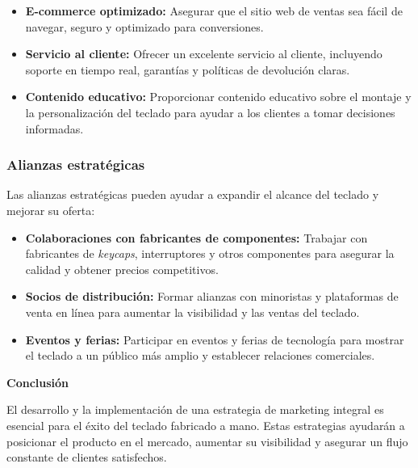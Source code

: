 \begin{itemize}
    \item \textbf{E-commerce optimizado:} Asegurar que el sitio web de ventas sea fácil de navegar, seguro y optimizado para conversiones.
    \item \textbf{Servicio al cliente:} Ofrecer un excelente servicio al cliente, incluyendo soporte en tiempo real, garantías y políticas de devolución claras.
    \item \textbf{Contenido educativo:} Proporcionar contenido educativo sobre el montaje y la personalización del teclado para ayudar a los clientes a tomar decisiones informadas.
\end{itemize}

\subsubsection{Alianzas estratégicas}

Las alianzas estratégicas pueden ayudar a expandir el alcance del teclado y mejorar su oferta:

\begin{itemize}
    \item \textbf{Colaboraciones con fabricantes de componentes:} Trabajar con fabricantes de \textit{keycaps}, interruptores y otros componentes para asegurar la calidad y obtener precios competitivos.
    \item \textbf{Socios de distribución:} Formar alianzas con minoristas y plataformas de venta en línea para aumentar la visibilidad y las ventas del teclado.
    \item \textbf{Eventos y ferias:} Participar en eventos y ferias de tecnología para mostrar el teclado a un público más amplio y establecer relaciones comerciales.
\end{itemize}

\textbf{Conclusión}

El desarrollo y la implementación de una estrategia de marketing integral es esencial para el éxito del teclado fabricado a mano. Estas estrategias ayudarán a posicionar el producto en el mercado, aumentar su visibilidad y asegurar un flujo constante de clientes satisfechos.
